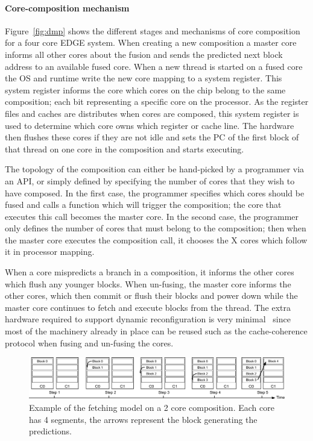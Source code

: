\paragraph*{Core-composition mechanism}
Figure~\ref{fig:dmp} shows the different stages and mechanisms of core composition for a four core EDGE system.
When creating a new composition a master core informs all other cores about the fusion and sends the predicted next block address to an available fused core.
When a new thread is started on a fused core the OS and runtime write the new core mapping to a system register.
This system register informs the core which cores on the chip belong to the same composition; each bit representing a specific core on the processor.
As the register files and caches are distributes when cores are composed, this system register is used to determine which core owns which register or cache line.
The hardware then flushes these cores if they are not idle and sets the PC of the first block of that thread on one core in the composition and starts executing.

The topology of the composition can either be hand-picked by a programmer via an API, or simply defined by specifying the number of cores that they wish to have composed.
In the first case, the programmer specifies which cores should be fused and calls a function which will trigger the composition; the core that executes this call becomes the master core.
In the second case, the programmer only defines the number of cores that must belong to the composition; then when the master core executes the composition call, it chooses the X cores which follow it in processor mapping.

When a core mispredicts a branch in a composition, it informs the other cores which flush any younger blocks.
When un-fusing, the master core informs the other cores, which then commit or flush their blocks and power down while the master core continues to fetch and execute blocks from the thread.
The extra hardware required to support dynamic reconfiguration is very minimal~\cite{kim2007tflex} since most of the machinery already in place can be reused such as the cache-coherence protocol when fusing and un-fusing the cores.

\begin{figure}[t]
    \centering
    \includegraphics[width=1\textwidth]{chapter3/graphics/normfetch.pdf}
    \caption{Example of the fetching model on a 2 core composition. Each core has 4 segments, the arrows represent the block generating the predictions.}
   \label{fig:old_fetch}
\end{figure}

